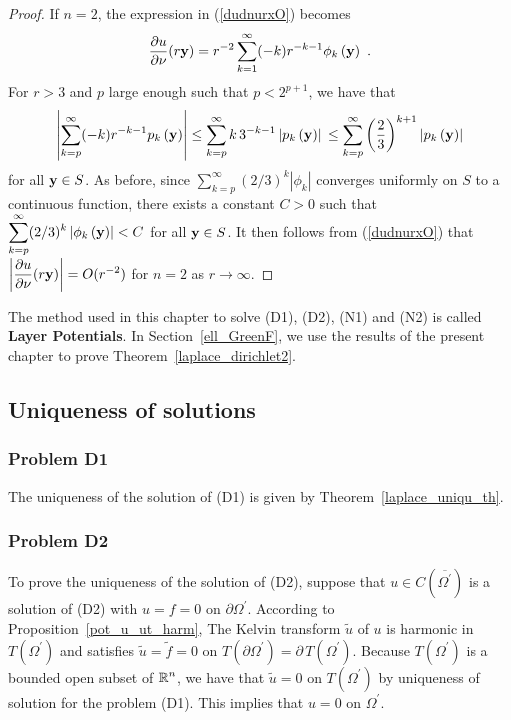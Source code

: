 \begin{proof}
 If $n=2$, the expression in (\ref{dudnurxO}) becomes
\[
\pdydx{u}{\VEC{\nu}}(r \VEC{y})  
= r^{-2} \sum_{k=1}^\infty (-k) r^{-k-1} \phi_k\left(\VEC{y}\right) \ .
\]
For $r>3$ and $p$ large enough such that $\displaystyle p < 2^{p+1}$,
we have that
\[
\left| \sum_{k=p}^{\infty} (-k) r^{-k-1} p_k\left(\mathbf{y}\right) \right|
\leq \sum_{k=p}^{\infty} k\, 3^{-k-1} \left| p_k\left(\mathbf{y}\right) \right| \\
\leq \sum_{k=p}^{\infty} \left(\frac{2}{3}\right)^{k+1}
\left| p_k\left(\mathbf{y}\right) \right|
\]
for all $\mathbf{y} \in S$.  As before, since
$\displaystyle \sum_{k=p}^{\infty} (2/3)^k |\phi_k|$
converges uniformly on $S$ to a continuous function, there exists a
constant $C>0$ such that
$\displaystyle \sum_{k=p}^{\infty} (2/3)^k \left|
  \phi_k\left(\mathbf{y}\right) \right| < C$
for all $\mathbf{y} \in S$.  It then follows
from (\ref{dudnurxO}) that
$\displaystyle \left| \frac{\partial{u}}{\partial \mathbf{\nu}}(r \mathbf{y}) \right| = O(r^{-2})$
for $n=2$ as $r \to \infty$.
\end{proof}

\begin{rmk}
The method used in this chapter to solve (D1), (D2), (N1) and (N2) is called
{\bfseries Layer Potentials}.
In Section~\ref{ell_GreenF}, we use the results of the present chapter
to prove Theorem~\ref{laplace_dirichlet2}.
\end{rmk}

\subsection{Uniqueness of solutions} \label{pot_sect_unique}

\subsubsection{Problem D1}
The uniqueness of the solution of (D1) is given by
Theorem~\ref{laplace_uniqu_th}.

\subsubsection{Problem D2}
To prove the uniqueness of the solution of (D2), suppose
that $\displaystyle u \in C(\overline{\Omega^{\prime}})$ is a solution
of (D2) with $u = f = 0$ on $\displaystyle \partial \Omega^{\prime}$.
According to Proposition~\ref{pot_u_ut_harm}, The Kelvin transform
$\tilde{u}$ of $u$ is harmonic in $\displaystyle T(\Omega^{\prime})$
and satisfies $\tilde{u} = \tilde{f} = 0$ on
$\displaystyle T(\partial \Omega^{\prime}) = \partial\,T(\Omega^{\prime})$.
Because $\displaystyle T(\Omega^{\prime})$
is a bounded open subset of $\displaystyle \mathbb{R}^n$, we have that
$\tilde{u} = 0$ on $\displaystyle T(\Omega^{\prime})$
by uniqueness of solution for the problem (D1). 
This implies that $u =0$ on $\displaystyle \Omega^{\prime}$.

